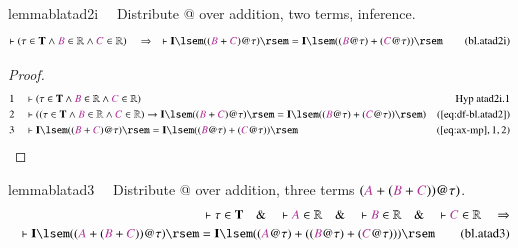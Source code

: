 \begin{restatable}{lemma}{blatad2i}~~ Distribute @ over addition, two terms,
inference.
\begin{align}
\vdash ( \tau \in \mathbf{T} \wedge \mc{B} \in \mathbb{R} \wedge \mc{C} \in
    \mathbb{R} )\quad\Rightarrow\quad \vdash \mathbf{I} \lsem ( ( \mc{B} +
    \mc{C} ) @ \tau ) \rsem = \mathbf{I} \lsem ( ( \mc{B} @ \tau ) + ( \mc{C} @
    \tau ) ) \rsem\label{eq:bl.atad2i}\tag{bl.atad2i}
\end{align}
\end{restatable}

\begin{proof}
\begin{align}
  1 &&  & \vdash ( \tau \in \mathbf{T} \wedge \mc{B} \in \mathbb{R} \wedge
      \mc{C} \in \mathbb{R}
      )&\text{Hyp~atad2i.1}\notag%
  \\ 2 &&  & \vdash ( ( \tau \in \mathbf{T} \wedge \mc{B} \in \mathbb{R} \wedge
      \mc{C} \in \mathbb{R} ) \rightarrow \mathbf{I} \lsem
      ( ( \mc{B} + \mc{C} ) @ \tau ) \rsem = \mathbf{I}
      \lsem ( ( \mc{B} @ \tau ) + ( \mc{C} @ \tau ) ) \rsem
      )&(\mbox{\ref{eq:df-bl.atad2}})\notag
  \\ 3 &&  & \vdash \mathbf{I} \lsem ( ( \mc{B} + \mc{C} ) @ \tau ) \rsem =
      \mathbf{I} \lsem ( ( \mc{B} @ \tau ) + ( \mc{C} @
      \tau ) ) \rsem&(\mbox{\ref{eq:ax-mp}},1,2)\notag
\end{align}
\end{proof}

\begin{restatable}{lemma}{blatad3}~~ Distribute @ over addition, three terms $(
\mc{A} + ( \mc{B} + \mc{C} ) ) @ \tau )$.
\begin{align}
\vdash \tau \in \mathbf{T}\quad\&\quad \vdash \mc{A} \in \mathbb{R}\quad\&\quad
    \vdash \mc{B} \in \mathbb{R}\quad\&\quad \vdash \mc{C} \in
    \mathbb{R}\quad\Rightarrow \notag \\ %
      \quad \vdash \mathbf{I} \lsem ( ( \mc{A} + (
    \mc{B} + \mc{C} ) ) @ \tau ) \rsem = \mathbf{I} \lsem ( ( \mc{A} @ \tau ) +
    ( ( \mc{B} @ \tau ) + ( \mc{C} @ \tau ) ) )
    \rsem\label{eq:bl.atad3}\tag{bl.atad3}
\end{align}
\end{restatable}

